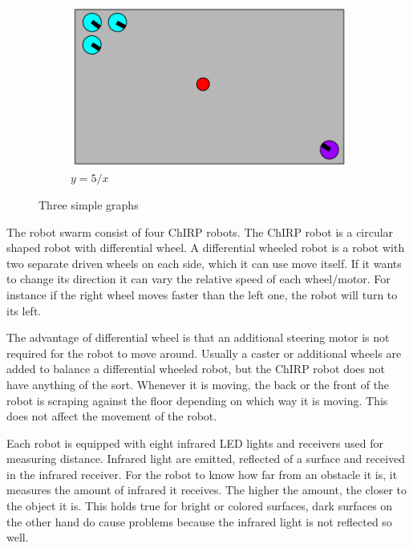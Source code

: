 \begin{figure}
    \hfill
    \begin{subfigure}[b]{0.3\textwidth}
        \centering
        \includegraphics[width=\textwidth]{figs/scenario1.png}
        \caption{$y=5/x$}
        \label{fig:five over x}
    \end{subfigure}
    \caption{Three simple graphs}
    \label{fig:three graphs}
\end{figure}


The robot swarm consist of four ChIRP robots. The ChIRP robot is a circular shaped robot with differential wheel. A differential wheeled robot is a robot with two separate driven wheels on each side, which it can use move itself. If it wants to change its direction it can vary the relative speed of each wheel/motor. For instance if the right wheel moves faster than the left one, the robot will turn to its left.

The advantage of differential wheel is that an additional steering motor is not required for the robot to move around. Usually a caster or additional wheels are added to balance a differential wheeled robot, but the ChIRP robot does not have anything of the sort. Whenever it is moving, the back or the front of the robot is scraping against the floor depending on which way it is moving. This does not affect the movement of the robot.

Each robot is equipped with eight infrared LED lights and receivers used for measuring distance. Infrared light are emitted, reflected of a surface and received in the infrared receiver. For the robot to know how far from an obstacle it is, it measures the amount of infrared it receives. The higher the amount, the closer to the object it is. This holds true for bright or colored surfaces, dark surfaces on the other hand do cause problems because the infrared light is not reflected so well.

